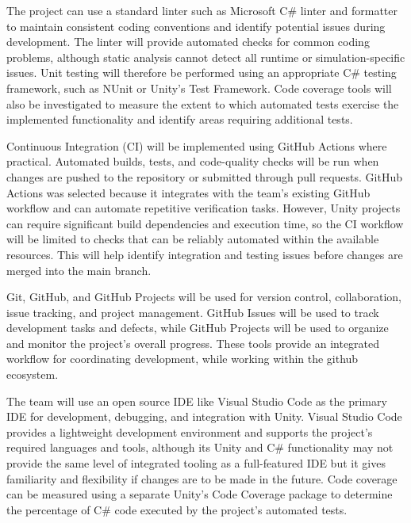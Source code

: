 \documentclass{article}
\begin{document}
\vspace{0.75em}

\noindent The project can use a standard linter such as Microsoft C\# linter and formatter to maintain consistent coding conventions and identify potential issues during development. The linter will provide automated checks for common coding problems, although static analysis cannot detect all runtime or simulation-specific issues. Unit testing will therefore be performed using an appropriate C\# testing framework, such as NUnit or Unity's Test Framework. Code coverage tools will also be investigated to measure the extent to which automated tests exercise the implemented functionality and identify areas requiring additional tests.
\vspace{0.75em}

\noindent Continuous Integration (CI) will be implemented using GitHub Actions where practical. Automated builds, tests, and code-quality checks will be run when changes are pushed to the repository or submitted through pull requests. GitHub Actions was selected because it integrates with the team's existing GitHub workflow and can automate repetitive verification tasks. However, Unity projects can require significant build dependencies and execution time, so the CI workflow will be limited to checks that can be reliably automated within the available resources. This will help identify integration and testing issues before changes are merged into the main branch.

\vspace{0.75em}
\noindent Git, GitHub, and GitHub Projects will be used for version control, collaboration, issue tracking, and project management. GitHub Issues will be used to track development tasks and defects, while GitHub Projects will be used to organize and monitor the project's overall progress. These tools provide an integrated workflow for coordinating development, while working within the github ecosystem.

\vspace{0.75em}
\noindent The team will use an open source IDE like Visual Studio Code as the primary IDE for development, debugging, and integration with Unity. Visual Studio Code provides a lightweight development environment and supports the project's required languages and tools, although its Unity and C\# functionality may not provide the same level of integrated tooling as a full-featured IDE but it gives familiarity and flexibility if changes are to be made in the future. Code coverage can be measured using a separate Unity's Code Coverage package to determine the percentage of C\# code executed by the project's automated tests. 
\end{document}

